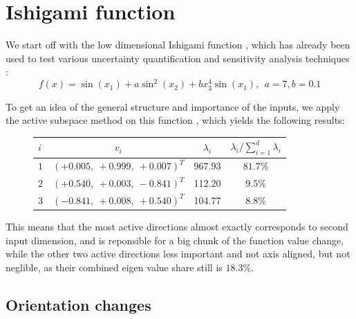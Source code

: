 \documentclass[
  a4paper,  %
  twoside,  %
  bibliography=totoc,
  headsepline,
  cleardoublepage=empty,
  parskip=half,
  draft=false
]{scrbook}
\begin{document}
\section{Ishigami function}

We start off with the low dimensional Ishigami function \cite{}, which has already been used to test various uncertainty quantification \cite{} and sensitivity analysis techniques \cite{}:
\begin{equation}
f(x)=\sin(x_1) + a \sin^2(x_2) + b x_3^4 \sin(x_1), ~~ a = 7, b=0.1
\end{equation}

To get an idea of the general structure and importance of the inputs, we apply the active subspace method on this function , which yields the following results:

\begin{mdframed}[style=style]
\begin{figure}[H]
\centering

\bgroup
\def\arraystretch{1.2}%
  \begin{tabular}{ l | c c c}
$i$ & $v_i$ & $\lambda_i$ & $\lambda_i / \sum_{i=1}^d \lambda_i$\\
\hline
$1$ & $(+0.005, ~+0.999, ~+0.007)^T$ & 967.93 & $81.7\%$\\
$2$  & $(+0.540, ~+0.003, ~-0.841)^T$ & 112.20 & $9.5\%$\\
$3$ & $(-0.841, ~+0.008, ~+0.540)^T$ & 104.77 & $8.8\%$\\
\end{tabular}
\egroup

\delimit

\end{figure}
\end{mdframed}

This means that the most active directions almost exactly corresponds to second input dimension, and is reponsible for a big chunk of the function value change, while the other two active directions less important and not axis aligned, but not neglible, as their combined eigen value share still is $18.3\%$.

\subsection{Orientation changes}
\end{document}
